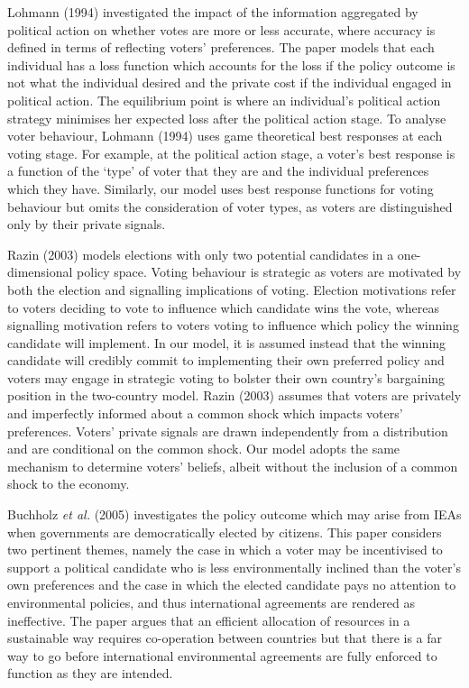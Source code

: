 \documentclass[11pt,preprint, authoryear]{elsarticle}
\numberwithin{equation}{section}
\numberwithin{figure}{section}
\numberwithin{table}{section}
\begin{document}
Lohmann (1994) investigated the impact of the information aggregated by
political action on whether votes are more or less accurate, where
accuracy is defined in terms of reflecting voters' preferences. The
paper models that each individual has a loss function which accounts for
the loss if the policy outcome is not what the individual desired and
the private cost if the individual engaged in political action. The
equilibrium point is where an individual's political action strategy
minimises her expected loss after the political action stage. To analyse
voter behaviour, Lohmann (1994) uses game theoretical best responses at
each voting stage. For example, at the political action stage, a voter's
best response is a function of the `type' of voter that they are and the
individual preferences which they have. Similarly, our model uses best
response functions for voting behaviour but omits the consideration of
voter types, as voters are distinguished only by their private signals.

Razin (2003) models elections with only two potential candidates in a
one-dimensional policy space. Voting behaviour is strategic as voters
are motivated by both the election and signalling implications of
voting. Election motivations refer to voters deciding to vote to
influence which candidate wins the vote, whereas signalling motivation
refers to voters voting to influence which policy the winning candidate
will implement. In our model, it is assumed instead that the winning
candidate will credibly commit to implementing their own preferred
policy and voters may engage in strategic voting to bolster their own
country's bargaining position in the two-country model. Razin (2003)
assumes that voters are privately and imperfectly informed about a
common shock which impacts voters' preferences. Voters' private signals
are drawn independently from a distribution and are conditional on the
common shock. Our model adopts the same mechanism to determine voters'
beliefs, albeit without the inclusion of a common shock to the economy.

Buchholz \emph{et al.} (2005) investigates the policy outcome which may
arise from IEAs when governments are democratically elected by citizens.
This paper considers two pertinent themes, namely the case in which a
voter may be incentivised to support a political candidate who is less
environmentally inclined than the voter's own preferences and the case
in which the elected candidate pays no attention to environmental
policies, and thus international agreements are rendered as ineffective.
The paper argues that an efficient allocation of resources in a
sustainable way requires co-operation between countries but that there
is a far way to go before international environmental agreements are
fully enforced to function as they are intended.
\end{document}

